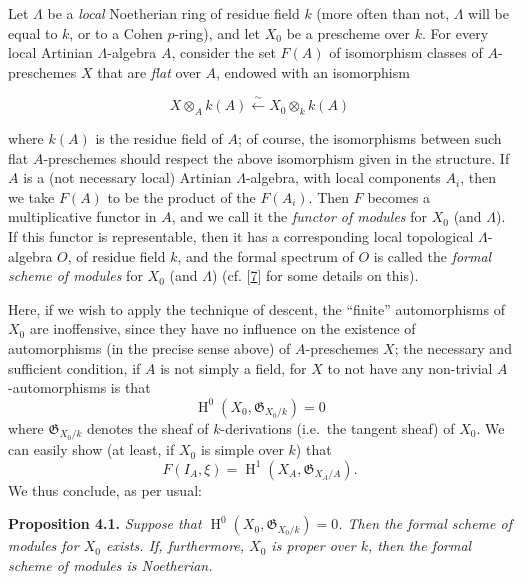 \documentclass{article}
\newenvironment{itenv}[1]
  {\phantomsection\par\smallskip\noindent\textbf{#1.}\itshape}
  {\par\smallskip}
\newcommand{\oldpage}[1]{\marginpar{\footnotesize$\Big\vert$ \textit{p.~#1}}}
\theoremstyle{definition}
\theoremstyle{definition}
\theoremstyle{definition}
\theoremstyle{definition}
\theoremstyle{remark}
\begin{document}
Let \(\Lambda\) be a \emph{local} Noetherian ring of residue field \(k\) (more often than not, \(\Lambda\) will be equal to \(k\), or to a Cohen \(p\)-ring), and let \(X_0\) be a prescheme over \(k\).
For every local Artinian \(\Lambda\)-algebra \(A\), consider the set \(F(A)\) of isomorphism classes of \(A\)-preschemes \(X\) that are \emph{flat} over \(A\), endowed with an isomorphism

\leavevmode{}%
\[
  X\otimes_A k(A) \xleftarrow{\sim}X_0\otimes_k k(A)
\tag{$*$}
\]

where \(k(A)\) is the residue field of \(A\);
of course, the isomorphisms between such flat \(A\)-preschemes should respect the above isomorphism given in the structure.
If \(A\) is a (not necessary local) Artinian \(\Lambda\)-algebra, with local components \(A_i\), then we take \(F(A)\) to be the product of the \(F(A_i)\).
Then \(F\) becomes a multiplicative functor in \(A\), and we call it the \emph{functor of modules} for \(X_0\) (and \(\Lambda\)).
If this functor is representable, then it has a corresponding local topological \(\Lambda\)-algebra \(O\), of residue field \(k\), and the formal spectrum of \(O\) is called the \emph{formal scheme of modules} for \(X_0\) (and \(\Lambda\)) (cf. {[}\protect\hyperlink{ref-Gro1958a}{7}{]} for some details on this).

Here, if we wish to apply the technique of descent, the ``finite'' automorphisms of \(X_0\) are inoffensive, since they have no influence on the existence of automorphisms (in the precise sense above) of \(A\)-preschemes \(X\);
the necessary and sufficient condition, if \(A\) is not simply a field, for \(X\) to not have any non-trivial \(A\)-automorphisms is that
\[
  \operatorname{H}^0(X_0,{\mathfrak{G}}_{X_0/k}) = 0
\]
where \({\mathfrak{G}}_{X_0/k}\) denotes the sheaf of \(k\)-derivations (i.e.~the tangent sheaf) of \(X_0\).
We can easily show (at least, if \(X_0\) is simple over \(k\)) that
\[
  F(I_A,\xi) = \operatorname{H}^1(X_A,{\mathfrak{G}}_{X_A/A}).
\]
We thus conclude, as per usual:

\leavevmode{}%
\begin{itenv}{Proposition 4.1}
Suppose that \(\operatorname{H}^0(X_0,{\mathfrak{G}}_{X_0/k})=0\).
\oldpage{195-18}Then the formal scheme of modules for \(X_0\) exists.
If, furthermore, \(X_0\) is proper over \(k\), then the formal scheme of modules is Noetherian.

\end{itenv}
\end{document}
